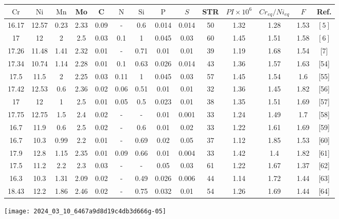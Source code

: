 \documentclass[10pt]{article}
\begin{document}
\begin{center}
\begin{tabular}{|c|c|c|c|c|c|c|c|c|c|c|c|c|c|}
\hline
$\mathrm{Cr}$ & $\mathrm{Ni}$ & $\mathrm{Mn}$ & Mo & C & $\mathrm{N}$ & $\mathrm{Si}$ & $\mathrm{P}$ & $S$ & STR & $P I \times 10^{6}$ & $C r_{e q} / N i_{e q}$ & $F$ & Ref. \\
\hline
16.17 & 12.57 & 0.23 & 2.33 & 0.09 & - & 0.6 & 0.014 & 0.014 & 50 & 1.32 & 1.28 & 1.53 & $[5]$ \\
\hline
17 & 12 & 2 & 2.5 & 0.03 & 0.1 & 1 & 0.045 & 0.03 & 60 & 1.45 & 1.51 & 1.58 & $[6]$ \\
\hline
17.26 & 11.48 & 1.41 & 2.32 & 0.01 & - & 0.71 & 0.01 & 0.01 & 39 & 1.19 & 1.68 & 1.54 & [7] \\
\hline
17.34 & 10.74 & 1.14 & 2.28 & 0.01 & 0.1 & 0.63 & 0.026 & 0.014 & 43 & 1.36 & 1.57 & 1.63 & [54] \\
\hline
17.5 & 11.5 & 2 & 2.25 & 0.03 & 0.11 & 1 & 0.045 & 0.03 & 57 & 1.45 & 1.54 & 1.6 & [55] \\
\hline
17.42 & 12.53 & 0.6 & 2.36 & 0.02 & 0.06 & 0.51 & 0.01 & 0.01 & 32 & 1.36 & 1.45 & 1.82 & [56] \\
\hline
17 & 12 & 1 & 2.5 & 0.01 & 0.05 & 0.5 & 0.023 & 0.01 & 38 & 1.35 & 1.51 & 1.69 & [57] \\
\hline
17.75 & 12.75 & 1.5 & 2.4 & 0.02 & - & - & 0.01 & 0.001 & 33 & 1.24 & 1.49 & 1.7 & [58] \\
\hline
16.7 & 11.9 & 0.6 & 2.5 & 0.02 & - & 0.6 & 0.01 & 0.02 & 33 & 1.22 & 1.61 & 1.69 & [59] \\
\hline
16.7 & 10.3 & 0.99 & 2.2 & 0.01 & - & 0.69 & 0.02 & 0.05 & 37 & 1.12 & 1.85 & 1.53 & [60] \\
\hline
17.9 & 12.8 & 1.15 & 2.35 & 0.01 & 0.09 & 0.66 & 0.01 & 0.004 & 33 & 1.42 & 1.4 & 1.82 & [61] \\
\hline
17.5 & 11.2 & 2.2 & 2.3 & 0.03 & - & - & 0.05 & 0.03 & 61 & 1.22 & 1.67 & 1.37 & [62] \\
\hline
16.3 & 10.3 & 1.31 & 2.09 & 0.02 & - & 0.49 & 0.026 & 0.006 & 44 & 1.14 & 1.72 & 1.44 & [63] \\
\hline
18.43 & 12.2 & 1.86 & 2.46 & 0.02 & - & 0.75 & 0.032 & 0.01 & 54 & 1.26 & 1.69 & 1.44 & [64] \\
\hline
\end{tabular}
\end{center}

\begin{center}
\texttt{[image: 2024\_03\_10\_6467a9d8d19c4db3d666g-05]}
\end{center}
\end{document}
